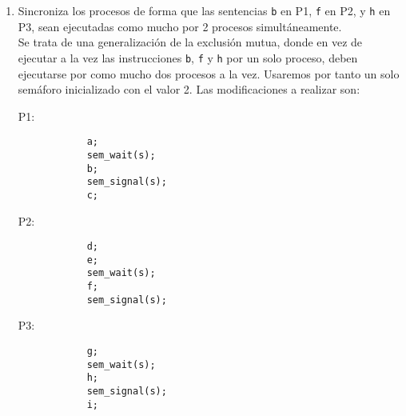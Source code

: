 \begin{ejercicio}
\begin{enumerate}
            Por tanto, las modificaciones a realizar son:
    \begin{multicols}{3}
        P1:
        \begin{verbatim}
            a;
            b;
            sem_signal(s1);
            sem_signal(s2);
            c;
        \end{verbatim}
        
        P2:
        \begin{verbatim}
            d;
            sem_wait(s1);
            e;
            f;
        \end{verbatim}

        P3:
        \begin{verbatim}
            g;
            sem_wait(s2);
            h;
            i;
        \end{verbatim}
    \end{multicols}
        \item Sincroniza los procesos de forma que las sentencias \verb|b| en P1, \verb|f| en P2, y \verb|h| en P3, sean ejecutadas como mucho por 2 procesos simultáneamente.\\
            Se trata de una generalización de la exclusión mutua, donde en vez de ejecutar a la vez las instrucciones \verb|b|, \verb|f| y \verb|h| por un solo proceso, deben ejecutarse por como mucho dos procesos a la vez. Usaremos por tanto un solo semáforo inicializado con el valor 2. Las modificaciones a realizar son:
    \begin{multicols}{3}
        P1:
        \begin{verbatim}
            a;
            sem_wait(s);
            b;
            sem_signal(s);
            c;
        \end{verbatim}
        
        P2:
        \begin{verbatim}
            d;
            e;
            sem_wait(s);
            f;
            sem_signal(s);
        \end{verbatim}

        P3:
        \begin{verbatim}
            g;
            sem_wait(s);
            h;
            sem_signal(s);
            i;
        \end{verbatim}
    \end{multicols}
    \end{enumerate}
\end{ejercicio}

